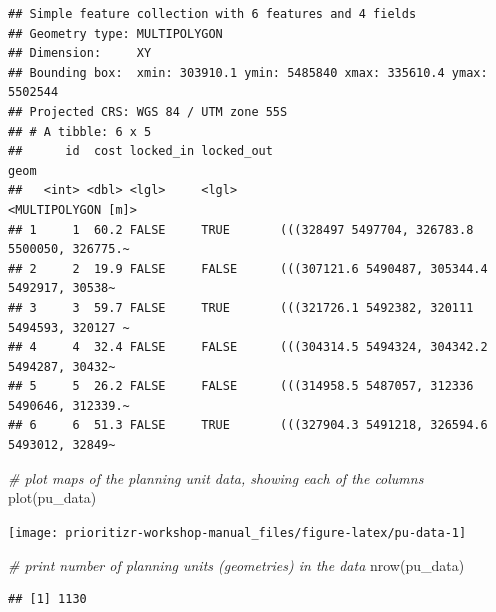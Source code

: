 \documentclass[
  12pt,
]{book}
\newenvironment{Shaded}{\begin{snugshade}}{\end{snugshade}}
\newcommand{\CommentTok}[1]{\textcolor[rgb]{0.56,0.35,0.01}{\textit{#1}}}
\newcommand{\FunctionTok}[1]{\textcolor[rgb]{0.00,0.00,0.00}{#1}}
\newcommand{\NormalTok}[1]{#1}
\newcommand{\SpecialCharTok}[1]{\textcolor[rgb]{0.00,0.00,0.00}{#1}}
\begin{document}
\begin{verbatim}
## Simple feature collection with 6 features and 4 fields
## Geometry type: MULTIPOLYGON
## Dimension:     XY
## Bounding box:  xmin: 303910.1 ymin: 5485840 xmax: 335610.4 ymax: 5502544
## Projected CRS: WGS 84 / UTM zone 55S
## # A tibble: 6 x 5
##      id  cost locked_in locked_out                                          geom
##   <int> <dbl> <lgl>     <lgl>                                 <MULTIPOLYGON [m]>
## 1     1  60.2 FALSE     TRUE       (((328497 5497704, 326783.8 5500050, 326775.~
## 2     2  19.9 FALSE     FALSE      (((307121.6 5490487, 305344.4 5492917, 30538~
## 3     3  59.7 FALSE     TRUE       (((321726.1 5492382, 320111 5494593, 320127 ~
## 4     4  32.4 FALSE     FALSE      (((304314.5 5494324, 304342.2 5494287, 30432~
## 5     5  26.2 FALSE     FALSE      (((314958.5 5487057, 312336 5490646, 312339.~
## 6     6  51.3 FALSE     TRUE       (((327904.3 5491218, 326594.6 5493012, 32849~
\end{verbatim}

\begin{Shaded}
\begin{Highlighting}[]
\CommentTok{\# plot maps of the planning unit data, showing each of the columns}
\FunctionTok{plot}\NormalTok{(pu\_data)}
\end{Highlighting}
\end{Shaded}

\begin{center}\texttt{[image: prioritizr-workshop-manual\_files/figure-latex/pu-data-1]} \end{center}

\clearpage

\begin{Shaded}
\begin{Highlighting}[]
\CommentTok{\# print number of planning units (geometries) in the data}
\FunctionTok{nrow}\NormalTok{(pu\_data)}
\end{Highlighting}
\end{Shaded}

\begin{verbatim}
## [1] 1130
\end{verbatim}

\begin{Shaded}
\end{Shaded}
\end{document}
